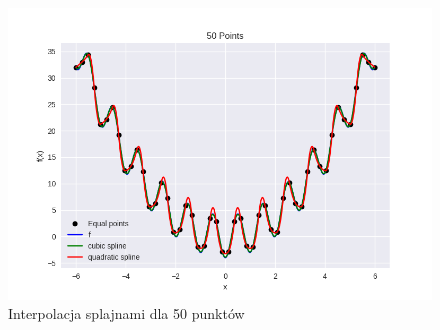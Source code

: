 \documentclass{article}
\begin{document}
\begin{figure}[H]
    \centering
    \includegraphics[width=\textwidth]{img/spline_50.png}
    \caption{Interpolacja splajnami dla 50 punktów}
\end{figure}
\end{document}
